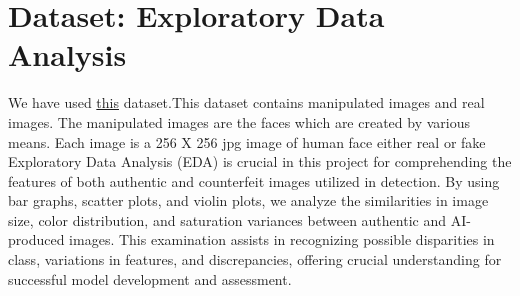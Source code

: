 \documentclass[10pt,twocolumn,letterpaper]{article}
\begin{document}
\section{Dataset: Exploratory Data Analysis}
We have used \href{https://www.kaggle.com/datasets/manjilkarki/deepfake-and-real-images}{this} dataset.This dataset contains manipulated images and real images. The manipulated images are the faces which are created by various means. Each image is a 256 X 256 jpg image of human face either real or fake
Exploratory Data Analysis (EDA) is crucial in this project for comprehending the features of both authentic and counterfeit images utilized in detection. By using bar graphs, scatter plots, and violin plots, we analyze the similarities in image size, color distribution, and saturation variances between authentic and AI-produced images. 
This examination assists in recognizing possible disparities in class, variations in features, and discrepancies, offering crucial understanding for successful model development and assessment.
\end{document}
